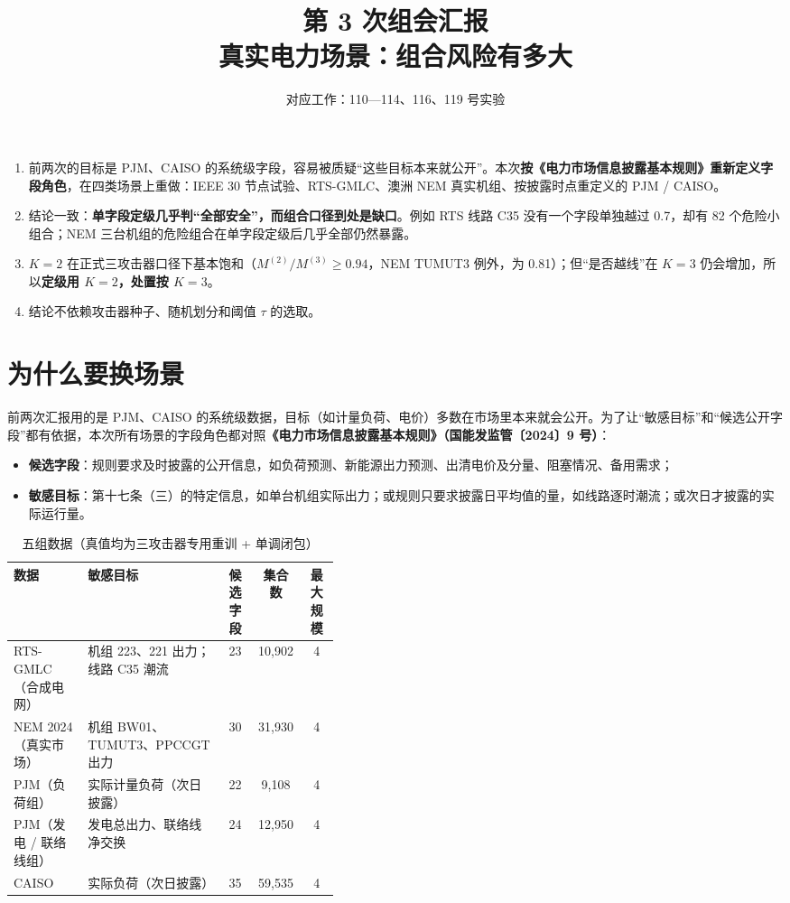 \documentclass[zihao=-4,a4paper]{ctexart}
\title{\textbf{第 3 次组会汇报}\\[4pt]\Large 真实电力场景：组合风险有多大}
\author{对应工作：110—114、116、119 号实验}
\date{}
\begin{document}
\maketitle
\thispagestyle{empty}

\begin{keybox}
\begin{enumerate}[leftmargin=*]
  \item 前两次的目标是 PJM、CAISO 的系统级字段，容易被质疑“这些目标本来就公开”。本次\textbf{按《电力市场信息披露基本规则》重新定义字段角色}，在四类场景上重做：IEEE 30 节点试验、RTS-GMLC、澳洲 NEM 真实机组、按披露时点重定义的 PJM / CAISO。
  \item 结论一致：\textbf{单字段定级几乎判“全部安全”，而组合口径到处是缺口}。例如 RTS 线路 C35 没有一个字段单独越过 0.7，却有 82 个危险小组合；NEM 三台机组的危险组合在单字段定级后几乎全部仍然暴露。
  \item $K=2$ 在正式三攻击器口径下基本饱和（$M^{(2)}/M^{(3)}\ge0.94$，NEM TUMUT3 例外，为 0.81）；但“是否越线”在 $K=3$ 仍会增加，所以\textbf{定级用 $K=2$，处置按 $K=3$}。
  \item 结论不依赖攻击器种子、随机划分和阈值 $\tau$ 的选取。
\end{enumerate}
\end{keybox}

\section{为什么要换场景}

前两次汇报用的是 PJM、CAISO 的系统级数据，目标（如计量负荷、电价）多数在市场里本来就会公开。为了让“敏感目标”和“候选公开字段”都有依据，本次所有场景的字段角色都对照\textbf{《电力市场信息披露基本规则》（国能发监管〔2024〕9 号）}：

\begin{itemize}[leftmargin=*]
  \item \textbf{候选字段}：规则要求及时披露的公开信息，如负荷预测、新能源出力预测、出清电价及分量、阻塞情况、备用需求；
  \item \textbf{敏感目标}：第十七条（三）的特定信息，如单台机组实际出力；或规则只要求披露日平均值的量，如线路逐时潮流；或次日才披露的实际运行量。
\end{itemize}

\begin{table}[H]\centering
\caption{五组数据（真值均为三攻击器专用重训 + 单调闭包）}
\footnotesize\setlength{\tabcolsep}{4pt}
\begin{tabular}{lp{0.42\linewidth}ccc}
\toprule
数据 & 敏感目标 & 候选字段 & 集合数 & 最大规模 \\
\midrule
RTS-GMLC（合成电网） & 机组 223、221 出力；线路 C35 潮流 & 23 & 10,902 & 4 \\
NEM 2024（真实市场） & 机组 BW01、TUMUT3、PPCCGT 出力 & 30 & 31,930 & 4 \\
PJM（负荷组） & 实际计量负荷（次日披露） & 22 & 9,108 & 4 \\
PJM（发电 / 联络线组） & 发电总出力、联络线净交换 & 24 & 12,950 & 4 \\
CAISO & 实际负荷（次日披露） & 35 & 59,535 & 4 \\
\bottomrule
\end{tabular}
\end{table}
\end{document}
